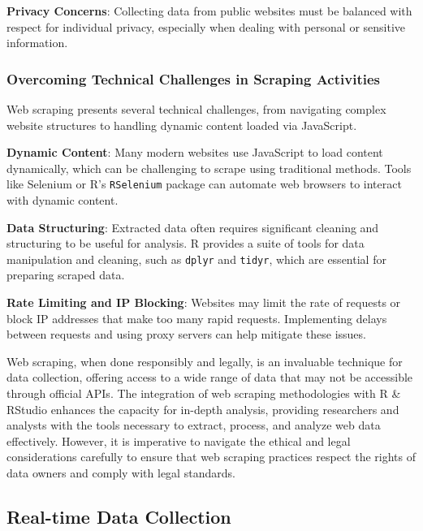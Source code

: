 \documentclass[
]{book}
\begin{document}
\textbf{Privacy Concerns}: Collecting data from public websites must be balanced with respect for individual privacy, especially when dealing with personal or sensitive information.

\hypertarget{overcoming-technical-challenges-in-scraping-activities}{%
\subsubsection*{Overcoming Technical Challenges in Scraping Activities}\label{overcoming-technical-challenges-in-scraping-activities}}

Web scraping presents several technical challenges, from navigating complex website structures to handling dynamic content loaded via JavaScript.

\textbf{Dynamic Content}: Many modern websites use JavaScript to load content dynamically, which can be challenging to scrape using traditional methods. Tools like Selenium or R's \texttt{RSelenium} package can automate web browsers to interact with dynamic content.

\textbf{Data Structuring}: Extracted data often requires significant cleaning and structuring to be useful for analysis. R provides a suite of tools for data manipulation and cleaning, such as \texttt{dplyr} and \texttt{tidyr}, which are essential for preparing scraped data.

\textbf{Rate Limiting and IP Blocking}: Websites may limit the rate of requests or block IP addresses that make too many rapid requests. Implementing delays between requests and using proxy servers can help mitigate these issues.

Web scraping, when done responsibly and legally, is an invaluable technique for data collection, offering access to a wide range of data that may not be accessible through official APIs. The integration of web scraping methodologies with R \& RStudio enhances the capacity for in-depth analysis, providing researchers and analysts with the tools necessary to extract, process, and analyze web data effectively. However, it is imperative to navigate the ethical and legal considerations carefully to ensure that web scraping practices respect the rights of data owners and comply with legal standards.

\hypertarget{real-time-data-collection}{%
\subsection*{Real-time Data Collection}\label{real-time-data-collection}}
\end{document}
